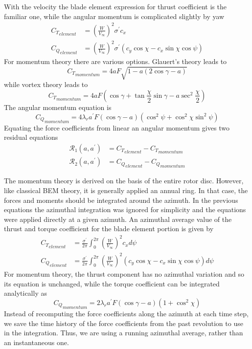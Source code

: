 \documentclass[]{aiaa-tc}%
\begin{document}
With the velocity the blade element expression for thrust coefficient is the familiar one, while the angular momentum is complicated slightly by yaw
\begin{align}
    {C_T}_{element}  &= \left(\frac{W}{V_\infty}\right)^2\sigma^\prime c_x\\
    {C_Q}_{element} &= \left(\frac{W}{V_\infty}\right)^2\sigma^\prime (c_y \cos\chi - c_x\sin\chi\cos\psi)
\end{align}
For momentum theory there are various options.  Glauert's theory leads to 
\begin{equation}
    {C_T}_{momentum} = 4 a F \sqrt{1 - a (2 \cos\gamma - a)}
\end{equation}
while vortex theory leads to
\begin{equation}
    {C_T}_{momentum} = 4 a F \left( \cos\gamma + \tan\frac{\chi}{2}\sin\gamma - a \sec^2\frac{\chi}{2}\right)
\end{equation}
The angular momentum equation is
\begin{equation}
    {C_Q}_{momentum} = 4 \lambda_r a^\prime F (\cos\gamma - a )(\cos^2\psi + \cos^2\chi \sin^2\psi)
\end{equation}
Equating the force coefficients from linear an angular momentum gives two residual equations
\begin{align}
    \mathcal{R}_1(a, a^\prime) &= {C_T}_{element} - {C_T}_{momentum}\\
    \mathcal{R}_2(a, a^\prime) &= {C_Q}_{element} - {C_Q}_{momentum}
\end{align}

The momentum theory is derived on the basis of the entire rotor disc.  However, like classical BEM theory, it is generally applied an annual ring.  In that case, the forces and moments should be integrated around the azimuth.  In the previous equations the azimuthal integration was ignored for simplicity and the equations were applied directly at a given azimuth.  An azimuthal average value of the thrust and torque coefficient for the blade element portion is given by
\begin{align}
    {C_T}_{element} &= \frac{\sigma^\prime}{2\pi}\int_0^{2\pi}\left(\frac{W}{V_\infty}\right)^2 c_x d\psi\\
    {C_Q}_{element} &= \frac{\sigma^\prime}{2\pi}\int_0^{2\pi} \left(\frac{W}{V_\infty}\right)^2(c_y \cos\chi - c_x\sin\chi\cos\psi) d\psi
\end{align}
For momentum theory, the thrust component has no azimuthal variation and so its equation is unchanged, while the torque coefficient can be integrated analytically as
\begin{equation}
    {C_Q}_{momentum} = 2 \lambda_r a^\prime F (\cos\gamma - a)(1 + \cos^2\chi)
\end{equation}
Instead of recomputing the force coefficients along the azimuth at each time step, we save the time history of the force coefficients from the past revolution to use in the integration.  Thus, we are using a running azimuthal average, rather than an instantaneous one.
\end{document}
